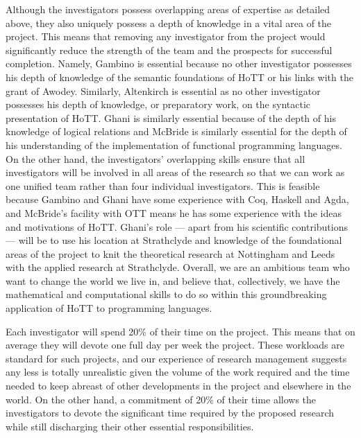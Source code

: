 \documentclass[a4paper,11pt]{article}
\begin{document}
\noindent Although the investigators possess overlapping areas of expertise as
detailed above, they also uniquely possess a depth of knowledge
in a vital area of the project. This means that removing any
investigator from the project would significantly reduce the strength
of the team and the prospects for successful completion. Namely, %
Gambino is essential because no other investigator possesses his depth
of knowledge of the semantic foundations of HoTT or his links with the
grant of Awodey. Similarly, Altenkirch is essential as no other
investigator possesses his depth of knowledge, or preparatory work, on
the syntactic presentation of HoTT. Ghani is similarly essential because
of the depth of his knowledge of logical relations and McBride is
similarly essential for the depth of his understanding of the
implementation of functional programming languages. On the other hand,
the investigators' overlapping skills ensure that all investigators
will be involved in all areas of the research so that we can work
as one unified team rather than four individual investigators. This is
feasible because Gambino and Ghani have some experience with
Coq, Haskell and Agda, and McBride's facility with OTT means he has some experience with
the ideas and motivations of HoTT. Ghani's role --- apart from his
scientific contributions --- will be to use his location at
Strathclyde and knowledge of the foundational areas of the
project to knit the theoretical research at Nottingham and Leeds with
the applied research at Strathclyde. Overall, we are an ambitious
team who want to change the world we live in, and believe that,
collectively, we have the mathematical and computational skills to do
so within this groundbreaking application of HoTT to programming languages.

\vspace{0.02in}

Each investigator will spend 20\% of their time on the project.  This
means that on average they will devote one full day per week the
project. These workloads are standard for such projects, and our
experience of research management suggests any less is totally
unrealistic given the volume of the work required and the time needed
to keep abreast of other developments in the project and elsewhere in
the world.  On the other hand, a commitment of 20\% of their time
allows the investigators to devote the significant time required by
the proposed research while still discharging their other essential
responsibilities.
\end{document}
